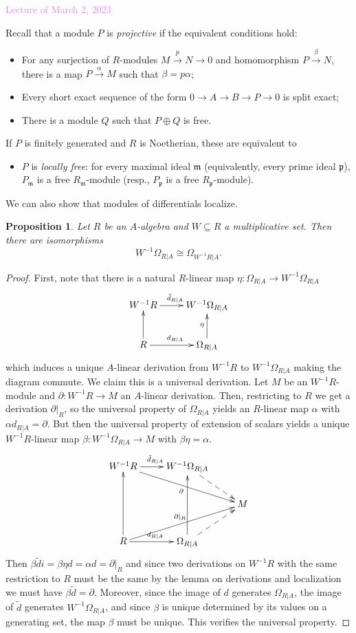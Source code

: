 \documentclass{amsart}[12pt]
\newcommand{\Mar}[1]{\textcolor{violet}{Lecture of March #1, 2023}}
\newcommand{\fp}{{\mathfrak p}}
\newcommand{\fm}{{\mathfrak m}}
\numberwithin{equation}{section}
\theoremstyle{plain} %
\newtheorem{prop}[equation]{Proposition}
\theoremstyle{definition}
\theoremstyle{remark}
\newcommand{\xra}[1]{\xrightarrow{#1}}
\begin{document}
\Mar{2}

Recall that a module $P$ is \emph{projective} if the equivalent conditions hold:
\begin{itemize}
\item For any surjection of $R$-modules $M\xra{p} N \to 0$ and homomorphism $P\xra{\beta} N$, there is a map $P\xra{\alpha} M$ such that $\beta = p \alpha$;
\item Every short exact sequence of the form $0 \to A \to B \to P \to 0$ is split exact;
\item There is a module $Q$ such that $P\oplus Q$ is free.
\end{itemize}
If $P$ is finitely generated and $R$ is Noetherian, these are equivalent to
\begin{itemize}
\item $P$ is \emph{locally free}: for every maximal ideal $\fm$ (equivalently, every prime ideal $\fp$), $P_\fm$ is a free $R_\fm$-module (resp., $P_{\fp}$ is a free $R_{\fp}$-module).
\end{itemize}


We can also show that modules of differentials localize.

\begin{prop}
Let $R$ be an $A$-algebra and $W\subseteq R$ a multiplicative set. Then there are isomorphisms
\[ W^{-1}\Omega_{R|A} \cong \Omega_{W^{-1}R|A}.\]
\end{prop}
\begin{proof}
First, note that there is a natural $R$-linear map $\eta:\Omega_{R|A} \to W^{-1}\Omega_{R|A}$
\[ \xymatrix{
W^{-1} R \ar[r]^{\tilde{d}_{R|A}} & W^{-1} \Omega_{R|A}  \\
R \ar[r]^{d_{R|A}} \ar[u] & \Omega_{R|A} \ar[u]^{\eta} }\]
which induces a unique $A$-linear derivation from $W^{-1}R$ to $W^{-1} \Omega_{R|A}$ making the diagram commute. We claim this is a universal derivation. Let $M$ be an $W^{-1}R$-module and $\partial:W^{-1}R \to M$ an $A$-linear derivation. Then, restricting to $R$ we get a derivation $\partial|_R$, so the universal property of $\Omega_{R|A}$ yields an $R$-linear map $\alpha$ with $\alpha d_{R|A} = \partial$. But then the universal property of extension of scalars yields a unique $W^{-1}R$-linear map $\beta:W^{-1} \Omega_{R|A} \to M$ with $\beta\eta =\alpha$.
\[ \xymatrix{
W^{-1} R \ar[r]^{\tilde{d}_{R|A}} \ar[rrd]_\partial & W^{-1} \Omega_{R|A} \ar@{-->}[dr] &  \\
& & M \\
R \ar[r]^{d_{R|A}} \ar[uu] \ar[rru]^{\partial|_R} & \Omega_{R|A} \ar[uu] \ar@{-->}[ur] & }\]
Then $\beta \tilde{d} i = \beta\eta d = \alpha d = \partial|_R$ and since two derivations on $W^{-1}R$ with the same restriction to $R$ must be the same by the lemma on derivations and localization we must have $\beta \tilde{d} = \partial$. Moreover, since the image of $d$ generates $\Omega_{R|A}$, the image of $\tilde{d}$ generates $W^{-1}\Omega_{R|A}$, and since $\beta$ is unique determined by its values on a generating set, the map $\beta$ must be unique. This verifies the universal property.
\end{proof}
\end{document}
